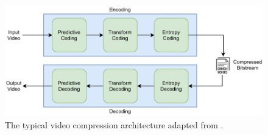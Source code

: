 \begin{figure}[!tb]
  \centering
  \includegraphics[width=0.8\linewidth]{img/comp_architecture.pdf}
  \caption[The typical video compression architecture]
  {
  The typical video compression architecture adapted from \cite{zhang_overview_2019}.
  }
  \label{fig:comp_architecture}
\end{figure}